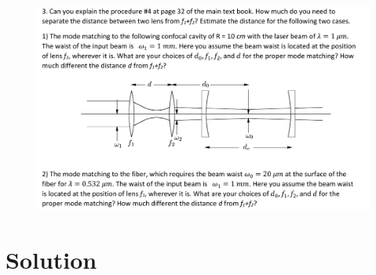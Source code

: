 \documentclass{article}
\begin{document}
\begin{figure}[ht]
	\centering
	\includegraphics[width=1.1\linewidth]{f3}
\end{figure}

\section*{Solution}
\end{document}
